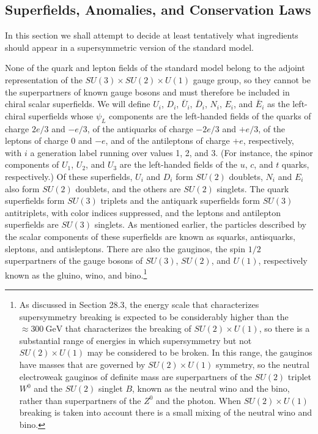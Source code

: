 
\subsection{Superfields, Anomalies, and Conservation Laws}

In this section we shall attempt to decide at least tentatively what
ingredients should appear in a supersymmetric version of the standard
model.

None of the quark and lepton fields of the standard model belong to the
adjoint representation of the
\(SU(3)\times SU(2)\times U(1)\) gauge group, so they
cannot be the superpartners of known gauge bosons and must therefore be
included in chiral scalar superfields. We will define \(U_i\), \(D_i\),
\(\bar U_i\), \(\bar D_i\), \(N_i\), \(E_i\), and \(\bar E_i\) as the
left-chiral superfields whose \(\psi_L\) components are the left-handed
fields of the quarks of charge \(2e/3\) and \(-e/3\), of the antiquarks
of charge \(-2e/3\) and \(+e/3\), of the leptons of charge \(0\) and
\(-e\), and of the antileptons of charge \(+e\), respectively, with
\(i\) a generation label running over values 1, 2, and 3. (For instance,
the spinor components of \(U_1\), \(U_2\), and \(U_3\) are the
left-handed fields of the \(u\), \(c\), and \(t\) quarks, respectively.)
Of these superfields, \(U_i\) and \(D_i\) form \(SU(2)\) doublets,
\(N_i\) and \(E_i\) also form \(SU(2)\) doublets, and the others are
\(SU(2)\) singlets. The quark superfields form \(SU(3)\) triplets and
the antiquark superfields form \(SU(3)\) antitriplets, with color indices
suppressed, and the leptons and antilepton superfields are \(SU(3)\)
singlets. As mentioned earlier, the particles described by the scalar
components of these superfields are known as squarks, antisquarks,
sleptons, and antisleptons. There are also the gauginos, the spin \(1/2\)
superpartners of the gauge bosons of \(SU(3)\), \(SU(2)\), and \(U(1)\),
respectively known as the gluino, wino, and bino.\footnote{As discussed
in Section 28.3, the energy scale that characterizes supersymmetry
breaking is expected to be considerably higher than the
\(\approx 300\ \mathrm{GeV}\) that characterizes the breaking of
\(SU(2)\times U(1)\), so there is a substantial range of
energies in which supersymmetry but not \(SU(2)\times U(1)\) may
be considered to be broken. In this range, the gauginos have masses that
are governed by \(SU(2)\times U(1)\) symmetry, so the neutral
electroweak gauginos of definite mass are superpartners of the \(SU(2)\)
triplet \(W^0\) and the \(SU(2)\) singlet \(B\), known as the neutral
wino and the bino, rather than superpartners of the \(Z^0\) and the
photon. When \(SU(2)\times U(1)\) breaking is taken into account
there is a small mixing of the neutral wino and bino.}

